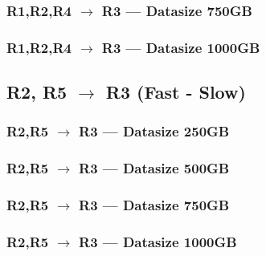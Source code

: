 \documentclass[a4paper,11pt]{article}
\begin{document}
\newpage
\subsubsection{R1,R2,R4 $\rightarrow$ R3 --- Datasize 750GB}



\newpage
\subsubsection{R1,R2,R4 $\rightarrow$ R3 --- Datasize 1000GB}



\newpage

\subsection{R2, R5 $\rightarrow$ R3 (Fast - Slow)}
\subsubsection{R2,R5 $\rightarrow$ R3 --- Datasize 250GB}



\newpage
\subsubsection{R2,R5 $\rightarrow$ R3 --- Datasize 500GB}



\newpage
\subsubsection{R2,R5 $\rightarrow$ R3 --- Datasize 750GB}



\newpage
\subsubsection{R2,R5 $\rightarrow$ R3 --- Datasize 1000GB}


\end{document}
